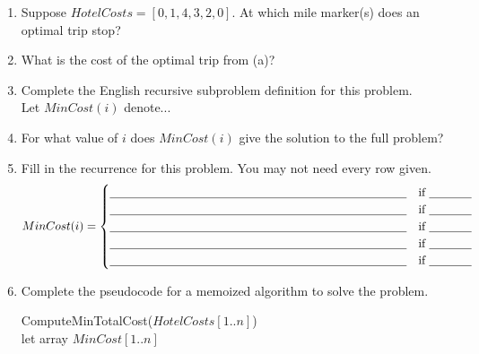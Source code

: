 \documentclass[11pt]{article}
\begin{document}
\begin{enumerate}
	\item Suppose $HotelCosts = [0,1, 4, 3, 2,0]$. At which mile marker(s) does an optimal trip stop?
    \underline{\hspace{4in}}
    \item What is the cost of the optimal trip from (a)? \underline{\hspace{1in}}
    \item Complete the English recursive subproblem definition for this problem.
    \\Let $MinCost(i)$ denote...
    \vspace{1in}
    \item For what value of $i$ does $MinCost(i)$ give the solution to the full problem?
    \underline{\hspace{1in}}
    \item Fill in the recurrence for this problem. You may not need every row given.
\[
MinCost(i)=
\begin{cases}
\underline{\hspace{3.5in}} & \text{if } \underline{\hspace{.5in}}\\
\underline{\hspace{3.5in}} & \text{if } \underline{\hspace{.5in}}\\
\underline{\hspace{3.5in}} & \text{if } \underline{\hspace{.5in}}\\
\underline{\hspace{3.5in}} & \text{if } \underline{\hspace{.5in}}\\
\underline{\hspace{3.5in}} & \text{if } \underline{\hspace{.5in}}\\
\end{cases}
\]
    \item Complete the pseudocode for a memoized algorithm to solve the problem.
    \begin{algo}
    ComputeMinTotalCost($HotelCosts[1..n]$)\+\\
   	let array $MinCost[1..n]$\\ 
    \hspace{6in}
    \\
    \\
    \\
    \\
    \\
    \\
    \\
    \\
    \\
    \\
    \\
    \\
    \end{algo}
\end{enumerate}
\end{document}
